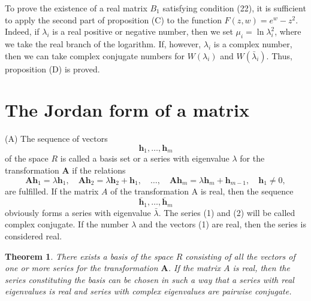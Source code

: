 \documentclass[10pt,a5paper]{book}
\makeatletter
\theoremstyle{plain}
\newtheorem{theorem}{Theorem}
\theoremstyle{definition}
\theoremstyle{remark}
\renewenvironment{proof}[1][\proofname]{\par
  \pushQED{\qed}%
  \normalfont\topsep6\p@\@plus6\p@\relax
  \trivlist
  \item\relax{\itshape #1\@addpunct{.}}\hspace\labelsep\ignorespaces
}{\popQED\endtrivlist\@endpefalse}
\makeatother
\begin{document}
\begin{proof}
To prove the existence of a real matrix $B_{1}$ satisfying condition (22), it is sufficient to apply the second part of proposition (C) to the function $F(z, w)=e^{w}-z^{2}$. Indeed, if $\lambda_{i}$ is a real positive or negative number, then we set $\mu_{i}=\ln \lambda_{i}^{2}$, where we take the real branch of the logarithm. If, however, $\lambda_{i}$ is a complex number, then we can take complex conjugate numbers for $W\left(\lambda_{i}\right)$ and $W\left(\bar{\lambda}_{i}\right)$. Thus, proposition (D) is proved.
\end{proof}
\section{The Jordan form of a matrix}
(A) The sequence of vectors
\begin{equation*}
\mathbf{h}_{1}, \ldots, \mathbf{h}_{m} \tag{1}
\end{equation*}
of the space $R$ is called a basis set or a series with eigenvalue $\lambda$ for the transformation $\mathbf{A}$ if the relations
\[
\mathbf{A} \mathbf{h}_{1}=\lambda \mathbf{h}_{1}, \quad \mathbf{A} \mathbf{h}_{2}=\lambda \mathbf{h}_{2}+\mathbf{h}_{1}, \quad \ldots, \quad \mathbf{A} \mathbf{h}_{m}=\lambda \mathbf{h}_{m}+\mathbf{h}_{m-1}, \quad \mathbf{h}_{1} \neq 0,
\]
are fulfilled. If the matrix $A$ of the transformation A is real, then the sequence
\begin{equation*}
\overline{\mathbf{h}}_{1}, \ldots, \overline{\mathbf{h}}_{m} \tag{2}
\end{equation*}
obviously forms a series with eigenvalue $\bar{\lambda}$. The series (1) and (2) will be called complex conjugate. If the number $\lambda$ and the vectors (1) are real, then the series is considered real.

\begin{theorem}
There exists a basis of the space $R$ consisting of all the vectors of one or more series for the transformation $\mathbf{A}$. If the matrix $A$ is real, then the series constituting the basis can be chosen in such a way that a series with real eigenvalues is real and series with complex eigenvalues are pairwise conjugate.
\end{theorem}
\end{document}
